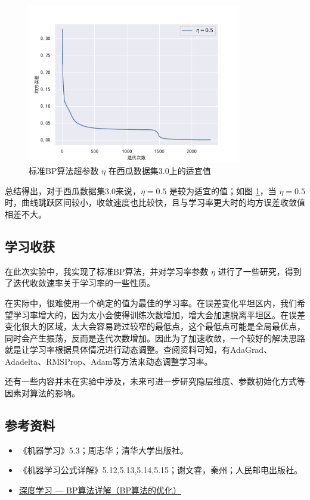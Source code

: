 \documentclass{ctexart}
\begin{document}
	\begin{figure}[!htb]
		\centering
		\includegraphics[height=7cm]{../image/标准BP较好值.pdf}
		\caption{标准BP算法超参数 $\eta$ 在西瓜数据集3.0上的适宜值}
		\label{标准BP适宜值}
	\end{figure}

	总结得出，对于西瓜数据集3.0来说，$\eta=0.5$ 是较为适宜的值；如图 \ref{标准BP适宜值}，当 $\eta=0.5$ 时，曲线跳跃区间较小，收敛速度也比较快，且与学习率更大时的均方误差收敛值相差不大。
	
	\subsection{学习收获}
	
	在此次实验中，我实现了标准BP算法，并对学习率参数 $\eta$ 进行了一些研究，得到了迭代收敛速率关于学习率的一些性质。
	
	在实际中，很难使用一个确定的值为最佳的学习率。在误差变化平坦区内，我们希望学习率增大的，因为太小会使得训练次数增加，增大会加速脱离平坦区。在误差变化很大的区域，太大会容易跨过较窄的最低点，这个最低点可能是全局最优点，同时会产生振荡，反而是迭代次数增加。因此为了加速收敛，一个较好的解决思路就是让学习率根据具体情况进行动态调整。查阅资料可知，有AdaGrad、Adadelta、RMSProp、Adam等方法来动态调整学习率。
	
	还有一些内容并未在实验中涉及，未来可进一步研究隐层维度、参数初始化方式等因素对算法的影响。
	
	\subsection{参考资料}
	
	\begin{itemize}
		\item 《机器学习》5.3；周志华；清华大学出版社。
		\item 《机器学习公式详解》5.12,5.13,5.14,5.15；谢文睿，秦州；人民邮电出版社。
		\item \href{https://blog.csdn.net/weixin_42398658/article/details/83958133}{深度学习 --- BP算法详解（BP算法的优化）}
	\end{itemize}
\end{document}
